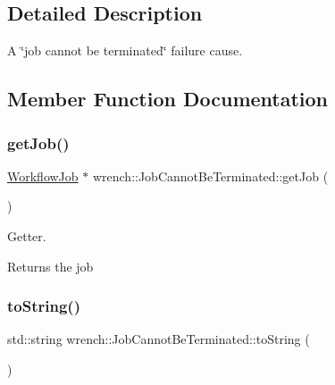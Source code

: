 \subsection{Detailed Description}
A \char`\"{}job cannot be terminated\char`\"{} failure cause. 

\subsection{Member Function Documentation}
\mbox{\label{classwrench_1_1_job_cannot_be_terminated_af97232722e1b4feed0c12b9e0ced666f}} 
\subsubsection{\texorpdfstring{get\+Job()}{getJob()}}
{\footnotesize\ttfamily \hyperlink{classwrench_1_1_workflow_job}{Workflow\+Job} $\ast$ wrench\+::\+Job\+Cannot\+Be\+Terminated\+::get\+Job (\begin{DoxyParamCaption}{ }\end{DoxyParamCaption})}



Getter. 

\begin{DoxyReturn}{Returns}
the job 
\end{DoxyReturn}
\mbox{\label{classwrench_1_1_job_cannot_be_terminated_acfa2b83db93bb68e0e773cc8b4a45505}} 
\subsubsection{\texorpdfstring{to\+String()}{toString()}}
{\footnotesize\ttfamily std\+::string wrench\+::\+Job\+Cannot\+Be\+Terminated\+::to\+String (\begin{DoxyParamCaption}{ }\end{DoxyParamCaption})\hspace{0.3cm}{\ttfamily [virtual]}}



